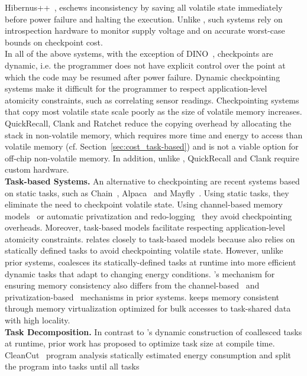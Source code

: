 Hibernus++~\cite{hibernusplusplus}, eschews inconsistency by saving all
volatile state immediately before power failure and halting the execution.
Unlike \sys, such systems rely on introspection hardware to monitor supply
voltage and on accurate worst-case bounds on checkpoint cost. \\
%
In all of the above systems, with the exception of DINO~\cite{dino},
checkpoints are dynamic, i.e. the programmer does not have explicit control
over the point at which the code may be resumed after power failure.
%
Dynamic checkpointing systems make it difficult for the programmer to respect
application-level atomicity constraints, such as correlating sensor readings.
%
Checkpointing systems that copy most volatile state scale poorly as the
size of volatile memory increases.  QuickRecall, Clank and Ratchet reduce
the copying overhead by allocating the stack in non-volatile memory, which
requires more time and energy to access than volatile memory (cf.
Section~\ref{sec:cost_task-based}) and is not a viable option for off-chip non-volatile
memory. In addition, unlike \sys, QuickRecall and Clank require custom hardware.  \\
%
\textbf{Task-based Systems.} An alternative to checkpointing are recent systems
based on static tasks, such as Chain~\cite{chain}, Alpaca~\cite{alpaca} and
Mayfly~\cite{hester_sensys_2017}. Using static tasks, they eliminate
the need to checkpoint volatile state. Using channel-based memory
models~\cite{chain,hester_sensys_2017} or automatic privatization and
redo-logging~\cite{alpaca} they avoid checkpointing overheads. Moreover,
task-based models facilitate respecting application-level atomicity
constraints.
%
\sys relates closely to task-based models because \sys also relies on
statically defined tasks to avoid checkpointing volatile state. 
%
However, unlike prior systems, \sys coalesces its statically-defined tasks at
runtime into more efficient dynamic tasks that adapt to changing energy
conditions.
%
\sys's mechanism for ensuring memory consistency also differs from the
channel-based~\cite{chain} and privatization-based~\cite{alpaca} mechanisms in
prior systems. \sys keeps memory consistent through memory virtualization
optimized for bulk accesses to task-shared data with high locality. \\
%
\textbf{Task Decomposition.} In contrast to \sys's dynamic construction of
coallesced tasks at runtime, prior work has proposed to optimize task size
at compile time. CleanCut~\cite{cleancut_2018} program analysis statically
estimated energy consumption and split the program into tasks until all tasks
